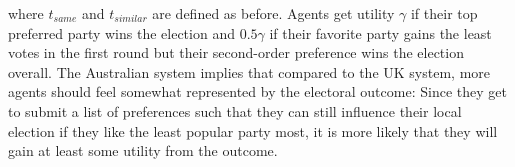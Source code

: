 \documentclass[12pt, a4paper]{article}
\begin{document}
where $t_{same}$ and $t_{similar}$ are defined as before. Agents get utility $\gamma$ if their top preferred party wins the election and $0.5 \gamma$ if their favorite party gains the least votes in the first round but their second-order preference wins the election overall.
The Australian system implies that compared to the UK system, more agents should feel somewhat represented by the electoral outcome: Since they get to submit a list of preferences such that they can still influence their local election if they like the least popular party most, it is more likely that they will gain at least some utility from the outcome.






\end{document}
